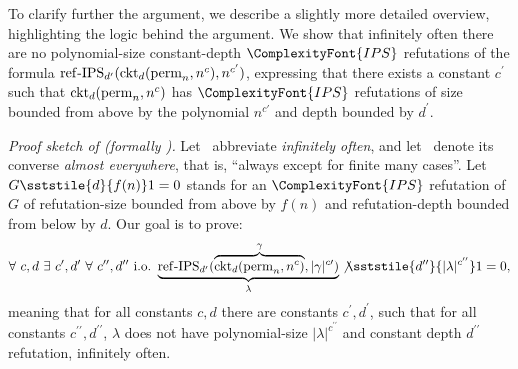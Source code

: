 \documentclass[11pt,letter]{article}
\theoremstyle{remark} %
\newcommand{\perm}{{\rm perm}}
\newcommand{\IPS}{%
    {
        \ComplexityFont{IPS} 
    }
}
\begin{document}
{To clarify further the argument, we describe a slightly more detailed overview, highlighting the logic behind the argument. We show that infinitely often there are no polynomial-size constant-depth $\IPS$ refutations of the formula ${\rm ref\text{-}IPS}_{d^\prime}({\rm ckt}_d(\perm_n,n^c), n^{c^\prime})$, expressing that there exists a constant $c^\prime$ such that ${\rm ckt}_d(\perm_n,n^c)$ has $\IPS$ refutations of size bounded from above by the polynomial $n^{c'}$ and depth bounded by $d^\prime$.
\medskip

\newcommand{\io}{\text{i.o.}}
\newcommand{\ale}{\text{a.e.}}

\noindent\textit{Proof sketch of   (formally ).}
Let \io\ abbreviate \emph{infinitely often}, and let \ale\ denote its converse \emph{almost everywhere}, that is, ``always except for finite many cases''. Let $G\sststile{d}{f(n)}1=0$ stands for an $\IPS$ refutation of $G$ of refutation-size bounded from above by $f(n)$ and refutation-depth bounded from below by $d$.
Our goal is to prove:\vspace{-12pt} 
\begin{equation}
    \forall\ c, d \ \exists \ c^\prime, d^\prime\ \forall \ c^{\prime\prime}, d^{\prime\prime}\
\io~\underbrace{{\rm ref\text{-}IPS}_{d^\prime}(\overbrace{{\rm ckt}_d(\perm_n,n^c)}^{\gamma}, |\gamma|^{c\prime}) }_{\lambda}\not \sststile{d^{\prime\prime}}{|\lambda|^{c^{\prime\prime}}} 1=0,
\end{equation}
meaning that for all constants $c,d$ there are constants $c^\prime,d^\prime$, such that for all constants $c^{\prime\prime},d^{\prime\prime}$, $\lambda$ does not have polynomial-size $|\lambda|^{c^{\prime\prime}}$ and constant depth $d^{\prime\prime}$ refutation, infinitely often.

}
\end{document}
